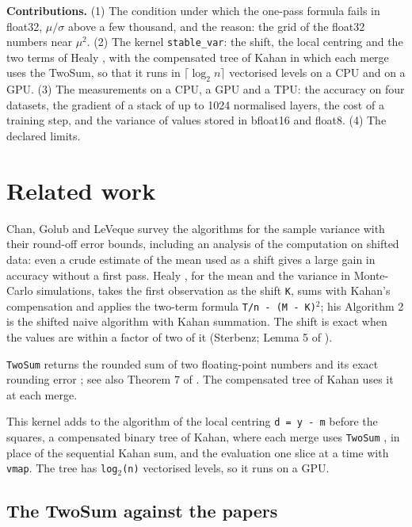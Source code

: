 \documentclass[11pt]{article}
\begin{document}
\textbf{Contributions.} (1) The condition under which the one-pass formula fails in float32, $\mu/\sigma$ above a few thousand, and the reason: the grid of the float32 numbers near $\mu^2$. (2) The kernel \texttt{stable\_var}: the shift, the local centring and the two terms of Healy \cite{healy2022}, with the compensated tree of Kahan in which each merge uses the TwoSum, so that it runs in $\lceil\log_2 n\rceil$ vectorised levels on a CPU and on a GPU. (3) The measurements on a CPU, a GPU and a TPU: the accuracy on four datasets, the gradient of a stack of up to 1024 normalised layers, the cost of a training step, and the variance of values stored in bfloat16 and float8. (4) The declared limits.

\section{Related work}

Chan, Golub and LeVeque \cite{chan1983} survey the algorithms for the sample variance with their round-off error bounds, including an analysis of the computation on shifted data: even a crude estimate of the mean used as a shift gives a large gain in accuracy without a first pass. Healy \cite{healy2022}, for the mean and the variance in Monte-Carlo simulations, takes the first observation as the shift \texttt{K}, sums with Kahan's compensation and applies the two-term formula \texttt{T/n - (M - K)$^{2}$}; his Algorithm 2 is the shifted naive algorithm with Kahan summation. The shift is exact when the values are within a factor of two of it (Sterbenz; Lemma 5 of \cite{shewchuk1997}).

\texttt{TwoSum} returns the rounded sum of two floating-point numbers and its exact rounding error \cite[Algorithm 3.1]{ogita2005}; see also Theorem 7 of \cite{shewchuk1997}. The compensated tree of Kahan uses it at each merge.

This kernel adds to the algorithm of \cite{healy2022} the local centring \texttt{d = y - m} before the squares, a compensated binary tree of Kahan, where each merge uses \texttt{TwoSum} \cite{ogita2005,shewchuk1997}, in place of the sequential Kahan sum, and the evaluation one slice at a time with \texttt{vmap}. The tree has \texttt{log$_{2}$(n)} vectorised levels, so it runs on a GPU.

\subsection{The TwoSum against the papers}
\end{document}

